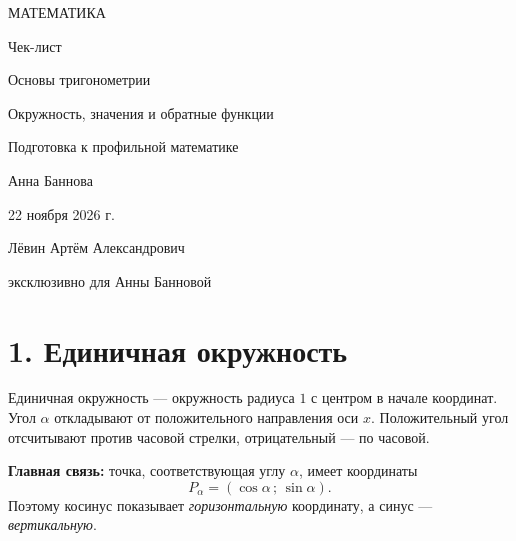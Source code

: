 \documentclass[a4paper,12pt]{article}
\newcommand{\sectionline}{\par\vspace{-2mm}{\color{accent}\rule{\linewidth}{0.35pt}}\par\vspace{2mm}}
\newcommand{\topic}[1]{\section*{\normalfont\color{darkaccent}#1}\sectionline}
\newcommand{\key}[1]{\textcolor{darkaccent}{#1}}
\begin{document}
\thispagestyle{empty}
\begin{center}
\vspace*{17mm}
{\Large\color{darkaccent} МАТЕМАТИКА}\par
\vspace{23mm}
{\Huge\color{textgray} Чек-лист}\par
\vspace{11mm}
{\LARGE\color{accent} Основы тригонометрии}\par
\vspace{3mm}
{\Large\color{accent} Окружность, значения и обратные функции}\par
\vspace{16mm}
{\large Подготовка к профильной математике}\par
\vfill
{\Large Анна Баннова}\par
\vspace{12mm}
{\large 22 ноября 2026 г.}\par
\vspace{18mm}
{\normalsize Лёвин Артём Александрович}\par
{\normalsize эксклюзивно для Анны Банновой}\par
\vspace{17mm}
\end{center}
\clearpage

\topic{1. Единичная окружность}
Единичная окружность --- окружность радиуса $1$ с центром в начале координат. Угол $\alpha$ откладывают от положительного направления оси $x$. \key{Положительный угол} отсчитывают против часовой стрелки, \key{отрицательный} --- по часовой.

\textbf{Главная связь:} точка, соответствующая углу $\alpha$, имеет координаты
\[
\boxed{P_\alpha=(\cos\alpha\,;\,\sin\alpha).}
\]
Поэтому косинус показывает \emph{горизонтальную} координату, а синус --- \emph{вертикальную}.
\end{document}
